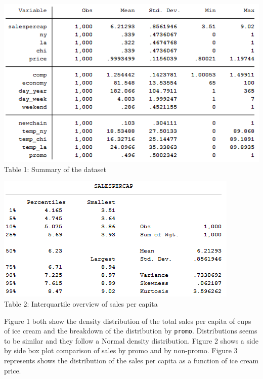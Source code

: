 \documentclass[10pt]{article}
\begin{document}
\begin{center}
  \includegraphics[scale=0.8]{g1.png}\\
Table 1: Summary of the dataset
\end{center}

\begin{center}
\includegraphics[scale=0.8]{g3.png}\\
Table 2: Interquartile overview of sales per capita
\end{center}

Figure 1 both show the density distribution of the total sales per capita of cups of ice cream and the breakdown of the distribution by {\tt promo}. Distributions seems to be similar and they follow a Normal density distribution. Figure 2 shows a side by side box plot comparison of sales by promo and by non-promo. Figure 3 represents shows the distribution of the sales per capita as a function of ice cream price. 
\end{document}
